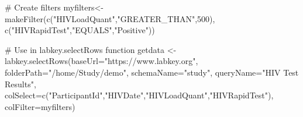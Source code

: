 \begin{Examples}
\begin{ExampleCode}

# Create filters
myfilters<- makeFilter(c("HIVLoadQuant","GREATER_THAN",500), c("HIVRapidTest","EQUALS","Positive"))

# Use in labkey.selectRows function
getdata <- labkey.selectRows(baseUrl="https://www.labkey.org", folderPath="/home/Study/demo", schemaName="study", queryName="HIV Test Results", colSelect=c("ParticipantId","HIVDate","HIVLoadQuant","HIVRapidTest"), colFilter=myfilters)


\end{ExampleCode}
\end{Examples}

